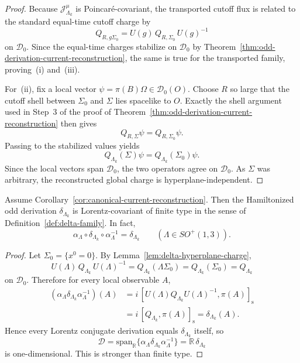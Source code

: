\begin{proof}
Because \(\mathcal J^\mu_{\Lambda_k}\) is Poincar\'e-covariant, the transported
cutoff flux is related to the standard equal-time cutoff charge by
\[
Q_{R,g\Sigma_0}=U(g)\,Q_{R,\Sigma_0}\,U(g)^{-1}
\]
on \(\mathcal D_0\). Since the equal-time charges stabilize on \(\mathcal D_0\) by
Theorem~\ref{thm:odd-derivation-current-reconstruction}, the same is true for the
transported family, proving~(i) and~(iii).

For~(ii), fix a local vector \(\psi=\pi(B)\Omega\in\mathcal D_0(O)\). Choose \(R\)
so large that the cutoff shell between \(\Sigma_0\) and \(\Sigma\) lies spacelike to
\(O\). Exactly the shell argument used in Step~3 of the proof of
Theorem~\ref{thm:odd-derivation-current-reconstruction} then gives
\[
Q_{R,\Sigma}\psi=Q_{R,\Sigma_0}\psi .
\]
Passing to the stabilized values yields
\[
Q_{\Lambda_k}(\Sigma)\psi=Q_{\Lambda_k}(\Sigma_0)\psi .
\]
Since the local vectors span \(\mathcal D_0\), the two operators agree on
\(\mathcal D_0\). As \(\Sigma\) was arbitrary, the reconstructed global charge is
hyperplane-independent.
\end{proof}

\begin{theorem}
\label{thm:delta-lorentz-finite-type}
Assume Corollary~\ref{cor:canonical-current-reconstruction}. Then the Hamiltonized
odd derivation \(\delta_{\Lambda_k}\) is Lorentz-covariant of finite type in the sense
of Definition~\ref{def:delta-family}. In fact,
\[
\alpha_\Lambda\circ\delta_{\Lambda_k}\circ\alpha_\Lambda^{-1}
=
\delta_{\Lambda_k}
\qquad
(\Lambda\in SO^+(1,3)).
\]
\end{theorem}

\begin{proof}
Let \(\Sigma_0=\{x^0=0\}\). By Lemma~\ref{lem:delta-hyperplane-charge},
\[
U(\Lambda)\,Q_{\Lambda_k}\,U(\Lambda)^{-1}
=
Q_{\Lambda_k}(\Lambda\Sigma_0)
=
Q_{\Lambda_k}(\Sigma_0)
=
Q_{\Lambda_k}
\]
on \(\mathcal D_0\). Therefore for every local observable \(A\),
\[
\begin{aligned}
(\alpha_\Lambda\delta_{\Lambda_k}\alpha_\Lambda^{-1})(A)
&=
i\,[U(\Lambda)Q_{\Lambda_k}U(\Lambda)^{-1},\pi(A)]_{\mathrm s}\\
&=
i\,[Q_{\Lambda_k},\pi(A)]_{\mathrm s}
=
\delta_{\Lambda_k}(A).
\end{aligned}
\]
Hence every Lorentz conjugate derivation equals \(\delta_{\Lambda_k}\) itself, so
\[
\mathscr D
=
\mathrm{span}_{\mathbb R}\{\alpha_\Lambda\delta_{\Lambda_k}\alpha_\Lambda^{-1}\}
=
\mathbb R\,\delta_{\Lambda_k}
\]
is one-dimensional. This is stronger than finite type.
\end{proof}

